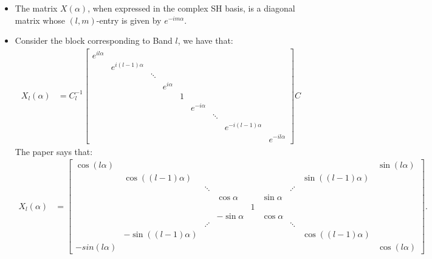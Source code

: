 \documentclass[10pt]{article}
\begin{document}
    \begin{itemize}
        \item The matrix $X(\alpha)$, when expressed in the complex SH basis, is a diagonal matrix whose $(l,m)$-entry is given by $e^{-im\alpha}$.

        \item Consider the block corresponding to Band $l$, we have that:
        \begin{align*}
            X_l(\alpha) &= C^{-1}_l \begin{bmatrix}
                e^{il\alpha} & & & & & & & & \\
                & e^{i(l-1)\alpha} & & & & & & & \\
                & & \ddots & & & & & & \\
                & & & e^{i\alpha} & & & & & \\
                & & & & 1 & & & & \\
                & & & & & e^{-i\alpha} & & & \\
                & & & & & & \ddots & & \\
                & & & & & & & e^{-i(l-1)\alpha} & \\
                & & & & & & & & e^{-il\alpha}
            \end{bmatrix}
            C
        \end{align*}
        The paper says that:
        \begin{align*}
            X_l(\alpha) &= \begin{bmatrix}
                \cos (l\alpha) & & & & & & & & \sin (l\alpha) \\
                & \cos ((l-1)\alpha) & & & & & & \sin ((l-1)\alpha) & \\
                & & \ddots & & & & \iddots & & \\
                & & & \cos\alpha & & \sin\alpha & & & \\
                & & & & 1 & & & & \\
                & & & -\sin\alpha & & \cos\alpha & & & \\
                & & \iddots & & & & \ddots & & \\
                & -\sin((l-1)\alpha) & & & & & & \cos((l-1)\alpha) & \\
                -sin(l\alpha) & & & & & & & & \cos(l\alpha) 
            \end{bmatrix}.
        \end{align*}
    \end{itemize}
\end{document}
